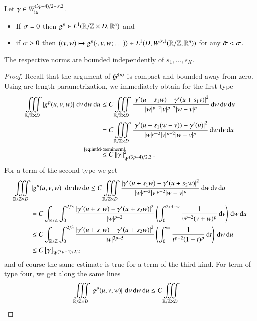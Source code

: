  \begin{lemma}\label{lem:reg-int}
  Let $\g\in\Wia[(3p-4)/2+\s,2]$.
  \begin{itemize}
  \item If $\s=0$ then $\gp\in L^{1}(\R/\Z\times D,\R^{n})$ and
  \item if $\s>0$ then $((v,w) \mapsto \gp(\cdot,v,w;\dots))\in L^{1}(D,\W[\tilde\s,1](\R/\Z, \R^{n}))$ for any $\tilde\s<\s$.
  \end{itemize}
  The respective norms are bounded independently of $s_{1},\dots,s_{K}$.
 \end{lemma}
 
 \begin{proof}
  Recall that the argument of $\G$ is compact and bounded away from zero.
  Using arc-length parametrization, we immediately obtain for the first type
  \begin{align*}
   \iiint\limits_{\mathbb R / \mathbb Z \times D }\abs{\gp(u,v,w)} \d v \d w \d u &\le C \iiint\limits_{\mathbb R / \mathbb Z \times D } 
   \frac{\abs{\dg(u+s_{1}w)-\dg(u+s_{1}v)}^{2}}{ |w|^{p-2} |v|^{p-2} |w-v|^p} \d w \d v \d u \\
   & =  C \iiint\limits_{\R/\Z \times D } \frac{\abs{\dg(u+s_{1}(w-v))-\dg(u)}^{2}}{ |w|^{p-2} |v|^{p-2} |w-v|^p} \d w \d v \d u \\
   &\refeq[\le]{intM<seminorm} C\norm\g_{\W[(3p-4)/2,2]}^{2}.
   \end{align*}
  For a term of the second type we get
  \begin{align*}
   \iiint\limits_{\mathbb R / \mathbb Z \times D } & \abs{\gp(u,v,w)} \d v \d w \d u \le C \iiint\limits_{\mathbb R / \mathbb Z \times D } 
   \frac{\abs{\dg(u+s_{1}w)-\dg(u+s_{2}w)}^{2}}{ |w|^{p-2} |v|^{p-2} |w-v|^p} \d w \d v \d u \\
   & =  C \int_{\R/\Z} \int_0^{2/3} \frac{\abs{\dg(u+s_{1}w)-\dg(u+s_2 w)}^{2}}{ |w|^{p-2}} \left(\int_0^{2/3-w} \frac 1 {v^{p-2}(v+w)^{p}}\d v\right) \d w \d u \\
   & \le C \int_{\R/\Z} \int_0^{2/3} \frac{\abs{\dg(u+s_{1}w)-\dg(u+s_2 w)}^{2}}{ |w|^{3p-5}} \left(\int_{0}^{\infty} \frac 1 {t^{p-2}(1+t)^{p}}\d t\right) \d w \d u \\
   & \le  C\seminorm\g_{\W[(3p-4)/2,2]}
  \end{align*}
  and of course the same estimate is true for a term of the third kind. For term of type four, we get along the same lines
  \begin{align*}
   \iiint\limits_{\mathbb R / \mathbb Z \times D } & \abs{\gp(u,v,w)} \d v \d w \d u \le C \iiint\limits_{\mathbb R / \mathbb Z \times D } 

\end{align*}
\end{proof}
